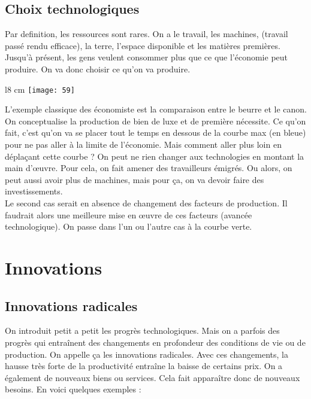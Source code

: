 \subsection{Choix technologiques}
Par definition, les ressources sont rares. On a le travail, les machines, (travail passé rendu efficace), la terre, l'espace disponible et les matières premières. Jusqu'à présent, les gens veulent consommer plus que ce que l'économie peut produire. On va donc choisir ce qu'on va produire. 

\begin{wrapfigure}[9]{l}{8 cm}
	\texttt{[image: 59]}
\end{wrapfigure}
L'exemple classique des économiste est la comparaison entre le beurre et le canon. On conceptualise la production de bien de luxe et de première nécessite. Ce qu'on fait, c'est qu'on va se placer tout le temps en dessous de la courbe max (en bleue) pour ne pas aller à la limite de l'économie. Mais comment aller plus loin en déplaçant cette courbe ? On peut ne rien changer aux technologies en montant la main d'œuvre. Pour cela, on fait amener des travailleurs émigrés. Ou alors, on peut aussi avoir plus de machines, mais pour ça, on va devoir faire des investissements. \\
Le second cas serait en absence de changement des facteurs de production. Il faudrait alors une meilleure mise en œuvre de ces facteurs (avancée technologique). On passe dans l'un ou l'autre cas à la courbe verte. 

\section{Innovations}
\subsection{Innovations radicales}
On introduit petit a petit les progrès technologiques. Mais on a parfois des progrès qui entraînent des changements en profondeur des conditions de vie ou de production. On appelle ça les innovations radicales. Avec ces changements, la hausse très forte de la productivité entraîne la baisse de certains prix. On a également de nouveaux biens ou services. Cela fait apparaître donc de nouveaux besoins. En voici quelques exemples : 

